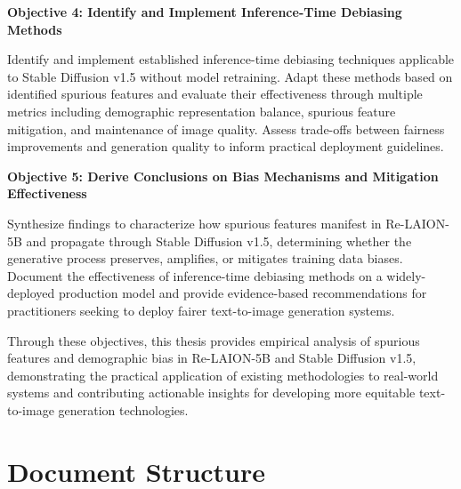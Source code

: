 \textbf{Objective 4: Identify and Implement Inference-Time Debiasing Methods}

Identify and implement established inference-time debiasing techniques applicable to Stable Diffusion v1.5 without model retraining. Adapt these methods based on identified spurious features and evaluate their effectiveness through multiple metrics including demographic representation balance, spurious feature mitigation, and maintenance of image quality. Assess trade-offs between fairness improvements and generation quality to inform practical deployment guidelines.

\textbf{Objective 5: Derive Conclusions on Bias Mechanisms and Mitigation Effectiveness}

Synthesize findings to characterize how spurious features manifest in Re-LAION-5B and propagate through Stable Diffusion v1.5, determining whether the generative process preserves, amplifies, or mitigates training data biases. Document the effectiveness of inference-time debiasing methods on a widely-deployed production model and provide evidence-based recommendations for practitioners seeking to deploy fairer text-to-image generation systems.

Through these objectives, this thesis provides empirical analysis of spurious features and demographic bias in Re-LAION-5B and Stable Diffusion v1.5, demonstrating the practical application of existing methodologies to real-world systems and contributing actionable insights for developing more equitable text-to-image generation technologies.

\section{Document Structure}

